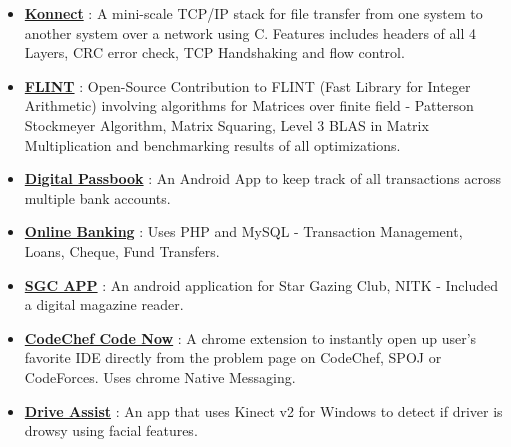 \documentclass[margin, centered]{res}
\begin{document}
\begin{resume}
\begin{itemize}[leftmargin=*]
 \item \textbf{\href{https://github.com/Bug-Assassins/Konnect}{Konnect}} : A mini-scale TCP/IP stack for file transfer from one system to another system over a network using C. Features includes headers of all 4 Layers, CRC error check, TCP Handshaking and flow control.
 \item \textbf{\href{https://github.com/ashish1294/flint2}{FLINT}} : Open-Source Contribution to FLINT (Fast Library for Integer Arithmetic) involving algorithms for Matrices over finite field - Patterson Stockmeyer Algorithm, Matrix Squaring, Level 3 BLAS in Matrix Multiplication and benchmarking results of all optimizations.
 \item \textbf{\href{https://github.com/ashish1294/DigitalPassbook}{Digital Passbook}} : An Android App to keep track of all transactions across multiple bank accounts.
 \item \textbf{\href{https://github.com/ashish1294/OnlineBankingPHP}{Online Banking}} : Uses PHP and MySQL - Transaction Management, Loans, Cheque, Fund Transfers.
 \item \textbf{\href{https://github.com/ashish1294/SGC-App}{SGC APP}} : An android application for Star Gazing Club, NITK - Included a digital magazine reader.
 \item \textbf{\href{https://github.com/ashish1294/code-now-CodeChef}{CodeChef Code Now}} : A chrome extension to instantly open up user's favorite IDE directly from the problem page on CodeChef, SPOJ or CodeForces. Uses chrome Native Messaging.
 \item \textbf{\href{}{Drive Assist}} : An app that uses Kinect v2 for Windows to detect if driver is drowsy using facial features.
\end{itemize}



\end{resume}
\end{document}
